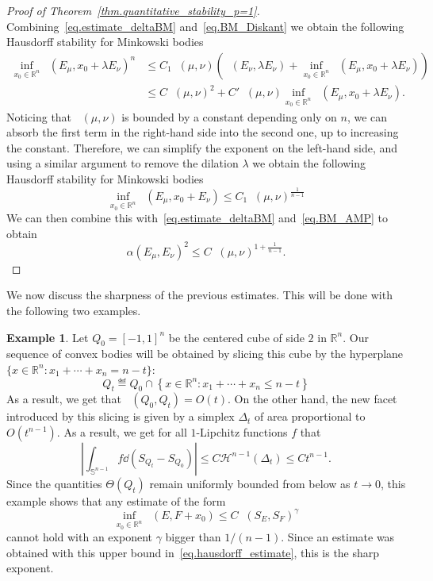 \documentclass[a4paper, 10pt, twoside]{amsart}
\numberwithin{equation}{section}
\newcommand{\explname}{Example}
\theoremstyle{plain}
\theoremstyle{definition}
\newtheorem{example}[theorem]{\explname}
\DeclareMathOperator{\dc}{\mathrm{d}_\mathrm{C}}
\DeclareMathOperator{\dH}{\mathrm{d}_\mathrm{H}}
\begin{document}
\begin{proof}[Proof of Theorem~\ref{thm.quantitative_stability_p=1}]
   Combining~\eqref{eq.estimate_deltaBM} and~\eqref{eq.BM_Diskant} we obtain the following Hausdorff stability for Minkowski bodies 
   \begin{align*}
        \inf_{x_0 \in \mathbb{R}^n} \dH(E_\mu, x_0 + \lambda E_\nu)^n
        &\le 
        C_1 \dc(\mu,\nu)
        \left( 
            \dH(E_\nu, \lambda E_\nu)    
            + 
            \inf_{x_0 \in \mathbb{R}^n} 
            \dH(E_\mu, x_0 + \lambda E_\nu)
        \right)\\ 
        &\le 
        C \dc(\mu,\nu)^2 + 
        C' \dc(\mu,\nu) 
        \inf_{x_0 \in \mathbb{R}^n} \dH(E_\mu, x_0 + \lambda E_\nu).
   \end{align*}
   Noticing that $\dc(\mu,\nu)$ is bounded by a constant depending only on $n$, we can absorb the first term in the right-hand side into the second one, up to increasing the constant. Therefore, we can simplify the exponent on the left-hand side, and using a similar argument to remove the dilation $\lambda$ we obtain the following Hausdorff stability for Minkowski bodies
   \begin{equation}\label{eq.hausdorff_estimate}
       \inf_{x_0 \in \mathbb{R}^n} \dH(E_\mu, x_0 + E_\nu)
        \le 
        C_1 \dc(\mu,\nu)^{\frac{1}{n-1}} 
   \end{equation}
   We can then combine this with~\eqref{eq.estimate_deltaBM} and~\eqref{eq.BM_AMP} to obtain 
   \begin{equation}\label{eq.fraenkel_estimate}
        \alpha(E_\mu,E_\nu)^2
        \le 
        C {\dc(\mu,\nu)}^{1 + \frac{1}{n-1}}.
   \end{equation}
\end{proof}

We now discuss the sharpness of the previous estimates. This will be done with the following two examples. 


\begin{example}\label{exemple.sharp_hausdorff}
    Let $Q_0 = {[-1,1]}^n$ be the centered cube of side $2$ in $\mathbb{R}^n$. Our sequence of convex bodies will be obtained by slicing this cube by the hyperplane $\{x \in \mathbb{R}^n : x_1 + \cdots + x_n = n - t\}$: 
    \[
        Q_t \eqdef 
        Q_0 \cap \left\{
            x \in \mathbb{R}^n : x_1 + \cdots + x_n \le n - t
        \right\}
    \]
    As a result, we get that $\dH(Q_0, Q_t) = O(t)$. On the other hand, the new facet introduced by this slicing is given by a simplex $\Delta_t$ of area proportional to $O(t^{n-1})$. As a result, we get for all $1$-Lipchitz functions $f$ that 
    \[
        \left|
            \int_{\mathbb{S}^{n-1}}
            f \dd(S_{Q_t} - S_{Q_0})
        \right|
        \le C \mathcal{H}^{n-1}(\Delta_t) \le C t^{n-1}. 
    \]
    Since the quantities $\Theta(Q_t)$ remain uniformly bounded from below as $t \to 0$, this example shows that any estimate of the form 
    \[
        \inf_{x_0 \in \mathbb{R}^n} 
        \dH(E, F + x_0) \le C 
        \dc(S_E, S_F)^\gamma
    \]
    cannot hold with an exponent $\gamma$ bigger than $1/(n-1)$. Since an estimate was obtained with this upper bound in~\eqref{eq.hausdorff_estimate}, this is the sharp exponent. 
\end{example}
\end{document}
